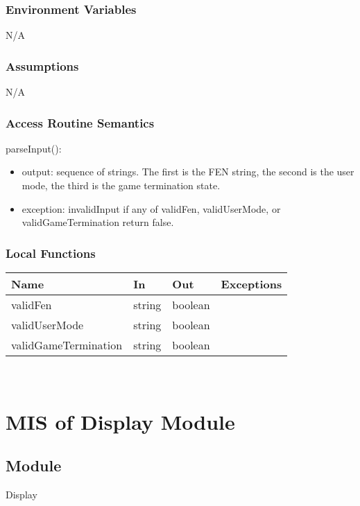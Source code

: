 \documentclass[12pt, titlepage]{article}
\begin{document}
    \subsubsection{Environment Variables}
        N/A

    \subsubsection{Assumptions}
        N/A
    
    \subsubsection{Access Routine Semantics}
        \noindent parseInput():
        \begin{itemize}
        \item output: sequence of strings. The first is the FEN string, the second is 
            the user mode, the third is the game termination state.
        \item exception: invalidInput if any of validFen, validUserMode, 
            or validGameTermination return false.
        \end{itemize}

    \subsubsection{Local Functions}
        \begin{center}
        \begin{tabular}{p{4.5cm} p{3cm} p{4cm} p{2.5cm}}
        \hline
        \textbf{Name} & \textbf{In} & \textbf{Out} & \textbf{Exceptions} \\
        \hline
        validFen & string & boolean & \\
        \hline
        validUserMode & string & boolean & \\
        \hline
        validGameTermination & string & boolean & \\
        \end{tabular}
        \end{center}
    
        ~\newpage
    

\section{MIS of Display Module} \label{mDisplay}

    \subsection{Module}
    Display
\end{document}
